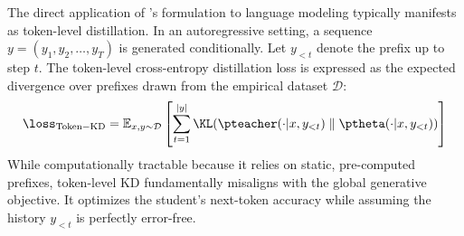 The direct application of \citet{hinton2015distilling}'s formulation to language modeling typically manifests as token-level distillation. In an autoregressive setting, a sequence $y = (y_1, y_2, \dots, y_T)$ is generated conditionally. Let $y_{<t}$ denote the prefix up to step $t$. The token-level cross-entropy distillation loss is expressed as the expected divergence over prefixes drawn from the empirical dataset $\mathcal{D}$:
\begin{equation}
    \loss_{\mathrm{Token-KD}} = \mathbb{E}_{x, y \sim \mathcal{D}} \left[ \sum_{t=1}^{|y|} \KL(\pteacher(\cdot | x, y_{<t}) \parallel \ptheta(\cdot | x, y_{<t})) \right]
\end{equation}
While computationally tractable because it relies on static, pre-computed prefixes, token-level KD fundamentally misaligns with the global generative objective. It optimizes the student's next-token accuracy while assuming the history $y_{<t}$ is perfectly error-free. 

